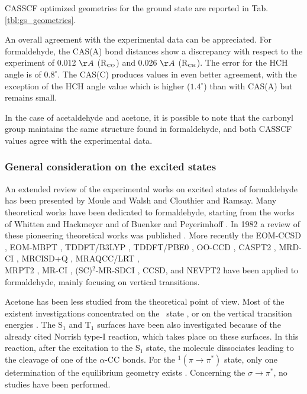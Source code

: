 CASSCF optimized geometries for the ground state are reported in Tab.
\ref{tbl:gs_geometries}. 

\vspace{5mm}
An overall agreement with the experimental data can be appreciated. For
formaldehyde, the CAS(A) bond distances show a discrepancy with respect to
the experiment of 0.012 $\AA$ (R$_{\mbox{\tiny CO}}$) and
0.026 $\AA$ (R$_{\mbox{\tiny CH}}$). The error for the HCH angle is of $0.8^{\circ}$. The
CAS(C) produces values in even better agreement, with the exception of the
HCH angle value which is higher ($1.4^{\circ}$) than with CAS(A) but remains small.

In the case of acetaldehyde and acetone, it is possible to note that the
carbonyl group maintains the same structure found in formaldehyde, and both
CASSCF values agree with the experimental data.
\subsubsection*{General consideration on the excited states}
An extended review of the experimental works on excited states of
formaldehyde has been presented by Moule and Walsh\cite{cr-75-67-1975} and
Clouthier and Ramsay\cite{arpc-34-31-1983}. Many theoretical works have been
dedicated to formaldehyde, starting from the works of Whitten and
Hackmeyer \cite{jcp-51-5584-1969} and of Buenker and Peyerimhoff
\cite{jcp-53-1368-1970}. In 1982 a review of these pioneering theoretical
works was published \cite{davidson-es}. More recently the EOM-CCSD
\cite{cpl-241-26-1995,cpl-248-189-1996}, EOM-MBPT \cite{cpl-248-189-1996},
TDDFT/B3LYP \cite{cpl-297-60-1998}, TDDFT/PBE0 \cite{jcp-111-2889-1999},
OO-CCD \cite{jcp-113-6509-2000}, CASPT2 \cite{tca-92-227-1995}, MRD-CI
\cite{jpc-99-8050-1995,jpc-99-16576-1995}, MRCISD+Q \cite{tca-106-369-2001},
MRAQCC/LRT \cite{tca-106-369-2001}, \\ MRPT2 \cite{cpl-296-435-1998},
MR-CI \cite{mp-100-1647-2002}, (SC)$^2$-MR-SDCI \cite{mp-101-483-2003},
CCSD\cite{mp-101-483-2003}, and NEVPT2 \cite{tca-111-352-2004} have been
applied to formaldehyde, mainly focusing on vertical transitions.

Acetone has been less studied from the theoretical point of view. Most of
the existent investigations concentrated on the \snpi\ state
\cite{jms_theo-365-29-1996,jms_theo-401-29-1997,jcp-110-62-1999,jcp-111-205-1999,cpl-337-331-2001},
or on the vertical transition energies
\cite{tca-111-352-2004,cpl-241-26-1995,cpl-297-60-1998,jcp-104-1791-1996,jpca-106-4192-2002}.
The S$_1$ and T$_1$ surfaces have been also investigated
\cite{cpc-2-273-2001,cpl-284-19-1998,cpl-325-86-2000,cpc-3-57-2002} because
of the already cited Norrish type-I reaction, which takes place on these surfaces.
In this reaction, after the excitation to the S$_1$ state, the molecule
dissociates leading to the cleavage of one of the $\alpha$-CC bonds. For the
${}^1(\pi \rightarrow \pi^{*})$ state, only one determination of the
equilibrium geometry exists \cite{cpc-3-57-2002}.  Concerning the $\sigma
\rightarrow \pi^{*}$, no studies have been performed.

